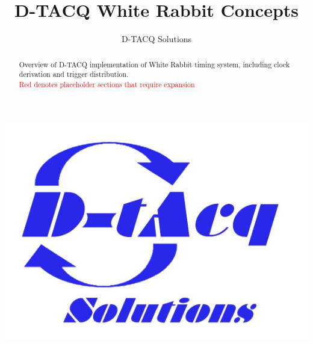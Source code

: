 \documentclass[]{article}
\title{D-TACQ White Rabbit Concepts}
\author{D-TACQ Solutions}
\begin{document}
\maketitle
\thispagestyle{empty} %
\begin{center}
\includegraphics{images/dtacq_logo_new}
\end{center}

\begin{abstract}
Overview of D-TACQ implementation of White Rabbit timing system, including clock derivation and trigger distribution.\\ \textcolor{red}{Red denotes placeholder sections that require expansion}
\end{abstract}

\begin{versionhistory}
\end{versionhistory}
\setcounter{table}{0} %

\pagebreak

\tableofcontents

\pagebreak
\end{document}
